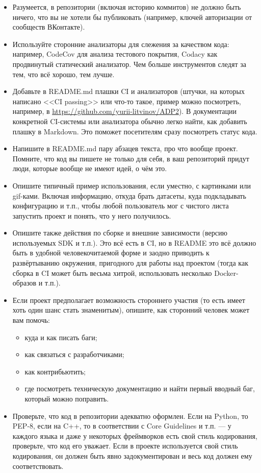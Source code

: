 \documentclass[a5paper]{article}
\begin{document}
\begin{itemize}
    \item Разумеется, в репозитории (включая историю коммитов) не должно быть ничего, что вы не хотели бы публиковать (например, ключей авторизации от сообществ ВКонтакте).
    \item Используйте сторонние анализаторы для слежения за качеством кода: например, CodeCov для анализа тестового покрытия, Codacy как продвинутый статический анализатор. Чем больше инструментов следят за тем, что всё хорошо, тем лучше.
    \item Добавьте в README.md плашки CI и анализаторов (штучки, на которых написано <<CI passing>> или что-то такое, пример можно посмотреть, например, в \url{https://github.com/yurii-litvinov/ADP2}). В документации конкретной CI-системы или анализатора обычно легко найти, как добавить плашку в Markdown. Это поможет посетителям сразу посмотреть статус кода.
    \item Напишите в README.md пару абзацев текста, про что вообще проект. Помните, что код вы пишете не только для себя, в ваш репозиторий придут люди, которые вообще не имеют идей, о чём это.
    \item Опишите типичный пример использования, если уместно, с картинками или gif-ками. Включая информацию, откуда брать датасеты, куда подкладывать конфигурацию и т.п., чтобы любой пользователь мог с чистого листа запустить проект и понять, что у него получилось.
    \item Опишите также действия по сборке и внешние зависимости (версию используемых SDK и т.п.). Это всё есть в CI, но в README это всё должно быть в удобной человекочитаемой форме и заодно приводить к развёртыванию окружения, пригодного для работы над проектом (тогда как сборка в CI может быть весьма хитрой, использовать несколько Docker-образов и т.п.).
    \item Если проект предполагает возможность стороннего участия (то есть имеет хоть один шанс стать знаменитым), опишите, как сторонний человек может вам помочь:
    \begin{itemize}
        \item куда и как писать баги;
        \item как связаться с разработчиками;
        \item как контрибьютить;
        \item где посмотреть техническую документацию и найти первый вводный баг, который можно поправить.
    \end{itemize}
    \item Проверьте, что код в репозитории адекватно оформлен. Если на Python, то PEP-8, если на C++, то в соответствии с Core Guidelines и т.п. --- у каждого языка и даже у некоторых фреймворков есть свой стиль кодирования, проверьте, что код его уважает. Если в проекте используется свой стиль кодирования, он должен быть явно задокументирован и весь код должен ему соответствовать.

\end{itemize}
\end{document}
